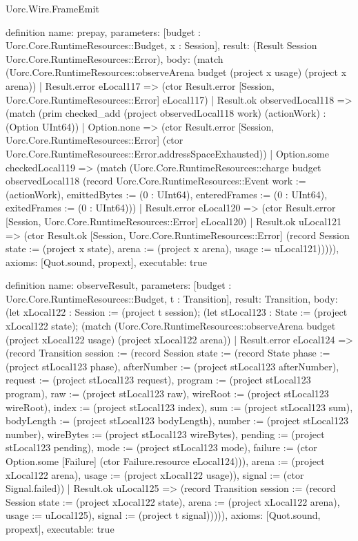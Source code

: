 \begin{lexlean}{Uorc.Wire.FrameEmit}
\begin{semanticmodule}
definition{
  name: prepay,
  parameters: [budget : Uorc.Core.RuntimeResources::Budget, x : Session],
  result: (Result Session Uorc.Core.RuntimeResources::Error),
  body: (match (Uorc.Core.RuntimeResources::observeArena budget (project x usage) (project x arena))
    | Result.error eLocal117 => (ctor Result.error [Session, Uorc.Core.RuntimeResources::Error] eLocal117)
    | Result.ok observedLocal118 => (match (prim checked_add (project observedLocal118 work) (actionWork) : (Option UInt64))
      | Option.none => (ctor Result.error [Session, Uorc.Core.RuntimeResources::Error] (ctor Uorc.Core.RuntimeResources::Error.addressSpaceExhausted))
      | Option.some checkedLocal119 => (match (Uorc.Core.RuntimeResources::charge budget observedLocal118 (record Uorc.Core.RuntimeResources::Event {work := (actionWork), emittedBytes := (0 : UInt64), enteredFrames := (0 : UInt64), exitedFrames := (0 : UInt64)}))
        | Result.error eLocal120 => (ctor Result.error [Session, Uorc.Core.RuntimeResources::Error] eLocal120)
        | Result.ok uLocal121 => (ctor Result.ok [Session, Uorc.Core.RuntimeResources::Error] (record Session {state := (project x state), arena := (project x arena), usage := uLocal121}))))),
  axioms: [Quot.sound, propext],
  executable: true
}

definition{
  name: observeResult,
  parameters: [budget : Uorc.Core.RuntimeResources::Budget, t : Transition],
  result: Transition,
  body: (let xLocal122 : Session := (project t session); (let stLocal123 : State := (project xLocal122 state); (match (Uorc.Core.RuntimeResources::observeArena budget (project xLocal122 usage) (project xLocal122 arena))
    | Result.error eLocal124 => (record Transition {session := (record Session {state := (record State {phase := (project stLocal123 phase), afterNumber := (project stLocal123 afterNumber), request := (project stLocal123 request), program := (project stLocal123 program), raw := (project stLocal123 raw), wireRoot := (project stLocal123 wireRoot), index := (project stLocal123 index), sum := (project stLocal123 sum), bodyLength := (project stLocal123 bodyLength), number := (project stLocal123 number), wireBytes := (project stLocal123 wireBytes), pending := (project stLocal123 pending), mode := (project stLocal123 mode), failure := (ctor Option.some [Failure] (ctor Failure.resource eLocal124))}), arena := (project xLocal122 arena), usage := (project xLocal122 usage)}), signal := (ctor Signal.failed)})
    | Result.ok uLocal125 => (record Transition {session := (record Session {state := (project xLocal122 state), arena := (project xLocal122 arena), usage := uLocal125}), signal := (project t signal)})))),
  axioms: [Quot.sound, propext],
  executable: true
}


\end{semanticmodule}
\end{lexlean}
